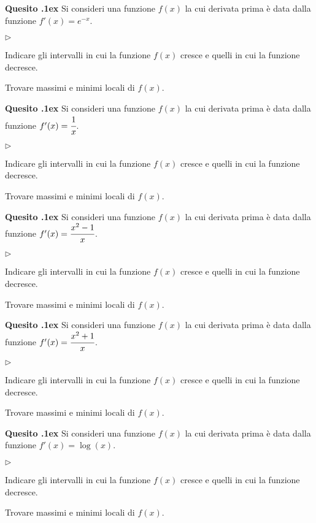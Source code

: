 \documentclass[11pt,twoside,a4paper]{article}
\newcommand{\mylabel}[1]{#1\hfill}
\renewenvironment{itemize}
  {\begin{list}{$\triangleright$}{%
   \setlength{\parskip}{0mm}
   \setlength{\topsep}{.4\baselineskip}
   \setlength{\rightmargin}{0mm}
   \setlength{\listparindent}{0mm}
   \setlength{\itemindent}{0mm}
   \setlength{\labelwidth}{2ex}
   \setlength{\itemsep}{.4\baselineskip}
   \setlength{\parsep}{0mm}
   \setlength{\partopsep}{0mm}
   \setlength{\labelsep}{1ex}
   \setlength{\leftmargin}{\labelwidth+\labelsep}
   \let\makelabel\mylabel}}{%
   \end{list}\vspace*{-1.3mm}}
\newcounter{quesito}
\newenvironment{question}{\bigskip\addtocounter{quesito}{1}\bigskip\bigskip\par\textbf{Quesito \thequesito.\kern1ex}}{\vspace{\parskip}}
\begin{document}
\begin{question}
Si consideri una funzione $f(x)$ la cui derivata prima è data dalla funzione $f'(x) = e^{-x}$.
\begin{itemize}
\item[1.] Indicare gli intervalli in cui la funzione $f(x)$ cresce e quelli in cui la funzione decresce.
\item[2.] Trovare massimi e minimi locali di $f(x)$.
\end{itemize}
\end{question}

\begin{question}
Si consideri una funzione $f(x)$ la cui derivata prima è data dalla funzione $f'(x) = \cfrac{1}{x}$.
\begin{itemize}
\item[1.] Indicare gli intervalli in cui la funzione $f(x)$ cresce e quelli in cui la funzione decresce.
\item[2.] Trovare massimi e minimi locali di $f(x)$.
\end{itemize}
\end{question}

\begin{question}
Si consideri una funzione $f(x)$ la cui derivata prima è data dalla funzione $f'(x) = \cfrac{x^2 - 1}{x}$.
\begin{itemize}
\item[1.] Indicare gli intervalli in cui la funzione $f(x)$ cresce e quelli in cui la funzione decresce.
\item[2.] Trovare massimi e minimi locali di $f(x)$.
\end{itemize}
\end{question}

\begin{question}
Si consideri una funzione $f(x)$ la cui derivata prima è data dalla funzione $f'(x) = \cfrac{x^2 + 1}{x}$.
\begin{itemize}
\item[1.] Indicare gli intervalli in cui la funzione $f(x)$ cresce e quelli in cui la funzione decresce.
\item[2.] Trovare massimi e minimi locali di $f(x)$.
\end{itemize}
\end{question}

\begin{question}
Si consideri una funzione $f(x)$ la cui derivata prima è data dalla funzione $f'(x) = \log (x)$.
\begin{itemize}
\item[1.] Indicare gli intervalli in cui la funzione $f(x)$ cresce e quelli in cui la funzione decresce.
\item[2.] Trovare massimi e minimi locali di $f(x)$.
\end{itemize}
\end{question}
\end{document}
